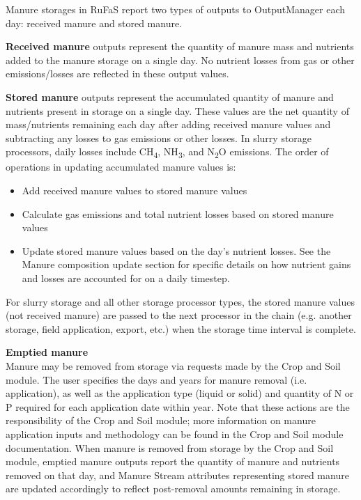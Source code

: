 \begin{refsection}
Manure storages in RuFaS report two types of outputs to OutputManager each day: received manure and stored manure. 
    \vspace{0.15cm}

\textbf{Received manure} outputs represent the quantity of manure mass and nutrients added to the manure storage on a single day. No nutrient losses from gas or other emissions/losses are reflected in these output values. 
    \vspace{0.15cm}

\textbf{Stored manure} outputs represent the accumulated quantity of manure and nutrients present in storage on a single day. These values are the net quantity of mass/nutrients remaining each day after adding received manure values and subtracting any losses to gas emissions or other losses. In slurry storage processors, daily losses include CH\textsubscript{4}, NH\textsubscript{3}, and N\textsubscript{2}O emissions. The order of operations in updating accumulated manure values is:
        \begin{itemize}
            \item Add received manure values to stored manure values
            \item Calculate gas emissions and total nutrient losses based on stored manure values
            \item Update stored manure values based on the day’s nutrient losses. See the Manure composition update section for specific details on how nutrient gains and losses are accounted for on a daily timestep. 
        \end{itemize}


For slurry storage and all other storage processor types, the stored manure values (not received manure) are passed to the next processor in the chain (e.g. another storage, field application, export, etc.) when the storage time interval is complete. 
\vspace{0.15cm}

\textbf{Emptied manure}\\
Manure may be removed from storage via requests made by the Crop and Soil module. The user specifies the days and years for manure removal (i.e. application), as well as the application type (liquid or solid) and quantity of N or P required for each application date within year. Note that these actions are the responsibility of the Crop and Soil module; more information on manure application inputs and methodology can be found in the Crop and Soil module documentation. When manure is removed from storage by the Crop and Soil module, emptied manure outputs report the quantity of manure and nutrients removed on that day, and Manure Stream attributes representing stored manure are updated accordingly to reflect post-removal amounts remaining in storage.


\end{refsection}
